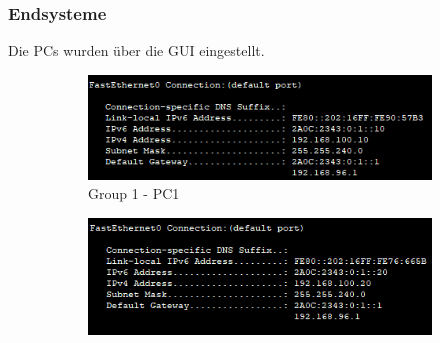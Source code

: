 \subsubsection{Endsysteme}
Die PCs wurden über die GUI eingestellt.
\begin{figure}[!htb]
    \centering
    \begin{subfigure}{.49\textwidth}
        \includegraphics[width=\textwidth,height=.85\textwidth,keepaspectratio]{./img/config/pc0.png}
        \caption{Group 1 - PC1}
    \end{subfigure}
    \begin{subfigure}{.49\textwidth}
        \includegraphics[width=\textwidth,height=.85\textwidth,keepaspectratio]{./img/config/pc1.png}

\end{subfigure}
\end{figure}
